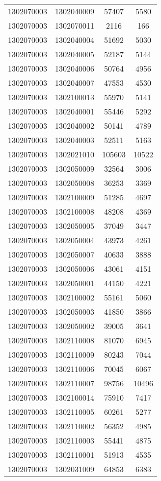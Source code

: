 \begin{longtable}{llcc}
1302070003 & 1302040009 & 57407 & 5580\\
1302070003 & 1302070011 & 2116 & 166\\
1302070003 & 1302040004 & 51692 & 5030\\
1302070003 & 1302040005 & 52187 & 5144\\
1302070003 & 1302040006 & 50764 & 4956\\
1302070003 & 1302040007 & 47553 & 4530\\
1302070003 & 1302100013 & 55970 & 5141\\
1302070003 & 1302040001 & 55446 & 5292\\
1302070003 & 1302040002 & 50141 & 4789\\
1302070003 & 1302040003 & 52511 & 5163\\
1302070003 & 1302021010 & 105603 & 10522\\
1302070003 & 1302050009 & 32564 & 3006\\
1302070003 & 1302050008 & 36253 & 3369\\
1302070003 & 1302100009 & 51285 & 4697\\
1302070003 & 1302100008 & 48208 & 4369\\
1302070003 & 1302050005 & 37049 & 3447\\
1302070003 & 1302050004 & 43973 & 4261\\
1302070003 & 1302050007 & 40633 & 3888\\
1302070003 & 1302050006 & 43061 & 4151\\
1302070003 & 1302050001 & 44150 & 4221\\
1302070003 & 1302100002 & 55161 & 5060\\
1302070003 & 1302050003 & 41850 & 3866\\
1302070003 & 1302050002 & 39005 & 3641\\
1302070003 & 1302110008 & 81070 & 6945\\
1302070003 & 1302110009 & 80243 & 7044\\
1302070003 & 1302110006 & 70045 & 6067\\
1302070003 & 1302110007 & 98756 & 10496\\
1302070003 & 1302100014 & 75910 & 7417\\
1302070003 & 1302110005 & 60261 & 5277\\
1302070003 & 1302110002 & 56352 & 4985\\
1302070003 & 1302110003 & 55441 & 4875\\
1302070003 & 1302110001 & 51913 & 4535\\
1302070003 & 1302031009 & 64853 & 6383\\

\end{longtable}
